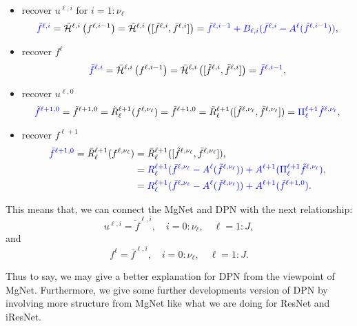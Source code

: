 \begin{itemize}
\item recover $u^{\ell,i}$ for $i = 1:\nu_\ell$
\begin{equation}
\textcolor{blue}{\tilde f^{\ell,i}} = \tilde{\mathcal{H}}^{\ell,i} \left(  f^{\ell,i-1} \right) = \tilde{\mathcal{H}}^{\ell,i} \left(  [\tilde f^{\ell,i} ,\bar f^{\ell,i}] \right) = 
\textcolor{blue}{\tilde f^{\ell,i-1} + B_{\ell,i}  ({\bar f^{\ell,i} -  A^{\ell} (\tilde f^{\ell,i-1})})},
\end{equation}
\item recover $f^{\ell}$
\begin{equation}
\textcolor{blue}{\bar f^{\ell,i}} = \bar{\mathcal{H}}^{\ell,i} \left(  f^{\ell,i-1} \right) = \bar{\mathcal{H}}^{\ell,i} \left(  [\tilde f^{\ell,i} ,\bar f^{\ell,i}] \right) = 
\textcolor{blue}{\bar f^{\ell,i-1}} ,
\end{equation}
\item recover $u^{\ell,0}$
\begin{equation}
\textcolor{blue}{\tilde f^{\ell+1,0}} = \tilde f^{\ell+1,0} =  \tilde R_\ell^{\ell+1} ( f^{\ell, \nu_\ell} ) = \tilde f^{\ell+1,0} =  
\tilde R_\ell^{\ell+1} ( [\tilde f^{\ell,\nu_\ell} ,\bar f^{\ell,\nu_\ell}]  )  = \textcolor{blue}{\Pi_\ell^{\ell+1} \tilde f^{\ell,\nu_\ell}},
\end{equation}
\item recover $f^{\ell+1}$
\begin{equation}
\begin{aligned}
\textcolor{blue}{\bar f^{\ell+1,0}} =  \bar R_\ell^{\ell+1} ( f^{\ell, \nu_\ell} ) 
&=  \bar R_\ell^{\ell+1} ( [\tilde f^{\ell,\nu_\ell} ,\bar f^{\ell,\nu_\ell}]  ),  \\
&= \textcolor{blue}{R^{\ell+1}_\ell( \bar f^{\ell,\nu_\ell} - A^\ell(\tilde f^{\ell,\nu_\ell})) + A^{\ell+1} (\Pi_\ell^{\ell+1} \tilde f^{\ell,\nu_\ell})},\\
&= \textcolor{blue}{R^{\ell+1}_\ell( \bar f^{\ell,\nu_\ell} - A^\ell(\tilde f^{\ell,\nu_\ell})) + A^{\ell+1} (\tilde f^{\ell+1,0})}. \\
\end{aligned}
\end{equation}
\end{itemize}
This means that, we can connect the MgNet and DPN with the next relationship:
\begin{equation}
u^{\ell,i} = \tilde f^{\ell,i}, \quad i = 0:\nu_\ell, \quad \ell = 1:J,
\end{equation}
and
\begin{equation}
f^{\ell} = \bar f^{\ell,i},  \quad i = 0:\nu_\ell, \quad \ell = 1:J.
\end{equation}

Thus to say, we may give a better explanation for DPN from the viewpoint of MgNet.
Furthermore, we give some further developments version of DPN by involving more
structure from MgNet like what we are doing for ResNet and iResNet.

